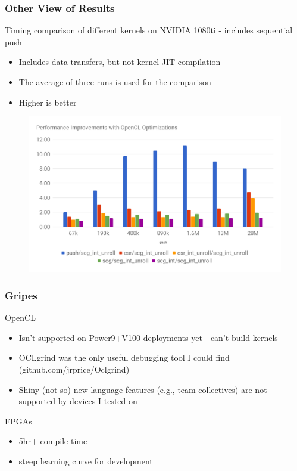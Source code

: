 \documentclass{beamer}
\begin{document}
\begin{frame}
  \frametitle{Other View of Results}
  \tiny
  Timing comparison of different kernels on NVIDIA 1080ti - includes sequential
  push
  \begin{itemize}
    \item Includes data transfers, but not kernel JIT compilation
    \item The average of three runs is used for the comparison
    \item Higher is better
  \end{itemize}
  \begin{figure}
    \centering
    \includegraphics[width=.9\textwidth]{results/bfs.png}
  \end{figure}  
\end{frame}

\begin{frame}
  \frametitle{Gripes}
  OpenCL 
  \begin{itemize}
    \item Isn't supported on Power9+V100 deployments yet - can't build kernels
    \item OCLgrind was the only useful debugging tool I could find (github.com/jrprice/Oclgrind)
    \item Shiny (not so) new language features (e.g., team collectives) are not supported by devices I tested on
  \end{itemize}
  FPGAs
  \begin{itemize}
    \item 5hr+ compile time
    \item steep learning curve for development
  \end{itemize}
\end{frame}
\end{document}
